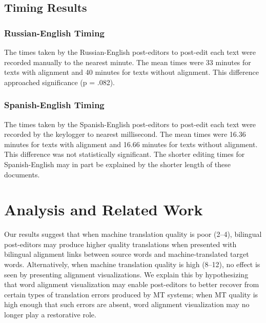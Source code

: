 





\subsection{Timing Results}

\subsubsection{Russian-English Timing}

The times taken by the Russian-English post-editors to post-edit each text were recorded manually to the nearest minute. The mean times were 33 minutes for texts with alignment and 40 minutes for texts without alignment. This difference approached significance (p = .082).

\subsubsection{Spanish-English Timing}

The times taken by the Spanish-English post-editors to post-edit each text were recorded by the keylogger to nearest millisecond. The mean times were 16.36 minutes for texts with alignment and 16.66 minutes for texts without alignment. This difference was not statistically significant.
%
The shorter editing times for Spanish-English may in part be explained by the shorter length of these documents.


\section{Analysis and Related Work}
\label{sec:background}

Our results suggest that when machine translation quality is poor (2--4), bilingual post-editors may produce higher quality translations when presented with bilingual alignment links between source words and machine-translated target words.
%
Alternatively, when machine translation quality is high (8--12), no effect is seen by presenting alignment visualizations.
%
We explain this by hypothesizing that word alignment visualization may enable post-editors to better recover from certain types of translation errors produced by MT systems; when MT quality is high enough that such errors are absent, word alignment visualization may no longer play a restorative role.


